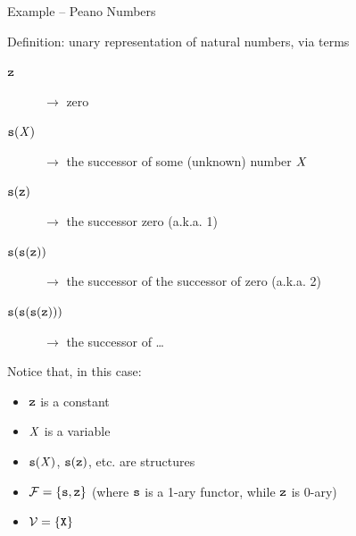 \documentclass[presentation]{beamer}\mode<presentation>{\usetheme{AMSBolognaFC}}
\begin{document}
\begin{frame}[allowframebreaks]{Example -- Peano Numbers}
    \begin{exampleblock}{Definition: unary representation of natural numbers, via terms}
        \begin{description}
            \item[$\mathtt{z}$] $\rightarrow$ zero
            \item[$\mathtt{s}(\mathit{X})$] $\rightarrow$ the successor of some (unknown) number $\mathit{X}$
            \item[$\mathtt{s}(\mathtt{z})$] $\rightarrow$ the successor zero (a.k.a. 1)
            \item[$\mathtt{s}(\mathtt{s}(\mathtt{z}))$] $\rightarrow$ the successor of the successor of zero (a.k.a. 2)
            \item[$\mathtt{s}(\mathtt{s}(\mathtt{s}(\mathtt{z})))$] $\rightarrow$ the successor of \ldots
        \end{description}
    \end{exampleblock}
    \begin{exampleblock}{Notice that, in this case:}
        \begin{itemize}
            \item $\mathtt{z}$ is a constant
            \item $\mathit{X}$ is a variable
            \item $\mathtt{s}(\mathit{X})$, $\mathtt{s}(\mathtt{z})$, etc. are structures
            \item $\mathcal{F} = \{ \mathtt{s}, \mathtt{z} \}$ \hfill {\footnotesize(where $\mathtt{s}$ is a 1-ary functor, while $\mathtt{z}$ is 0-ary)}
            \item $\mathcal{V} = \{ \mathtt{X} \}$
        \end{itemize}
    \end{exampleblock}
\end{frame}
\end{document}
